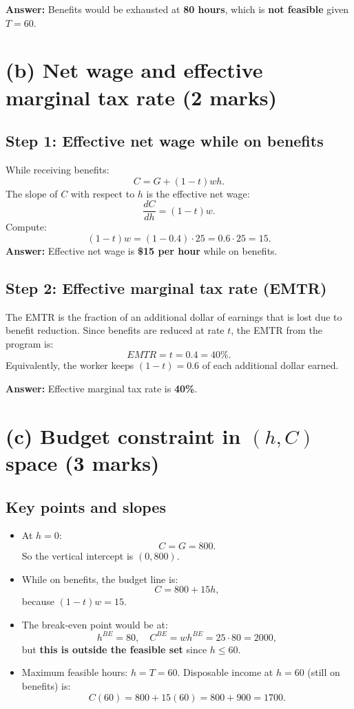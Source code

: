 \documentclass[12pt]{article}
\begin{document}
\textbf{Answer:} Benefits would be exhausted at \textbf{80 hours}, which is \textbf{not feasible} given $T=60$.

\section*{(b) Net wage and effective marginal tax rate (2 marks)}

\subsection*{Step 1: Effective net wage while on benefits}

While receiving benefits:
\[
C = G + (1-t)wh.
\]
The slope of $C$ with respect to $h$ is the effective net wage:
\[
\frac{dC}{dh} = (1-t)w.
\]
Compute:
\[
(1-t)w = (1-0.4)\cdot 25 = 0.6 \cdot 25 = 15.
\]
\textbf{Answer:} Effective net wage is \textbf{\$15 per hour} while on benefits.

\subsection*{Step 2: Effective marginal tax rate (EMTR)}

The EMTR is the fraction of an additional dollar of earnings that is lost due to benefit reduction.  
Since benefits are reduced at rate $t$, the EMTR from the program is:
\[
EMTR = t = 0.4 = 40\%.
\]
Equivalently, the worker keeps $(1-t)=0.6$ of each additional dollar earned.

\textbf{Answer:} Effective marginal tax rate is \textbf{40\%}.

\section*{(c) Budget constraint in $(h,C)$ space (3 marks)}

\subsection*{Key points and slopes}

\begin{itemize}
\item At $h=0$:
\[
C = G = 800.
\]
So the vertical intercept is $(0,800)$.

\item While on benefits, the budget line is:
\[
C = 800 + 15h,
\]
because $(1-t)w=15$.

\item The break-even point would be at:
\[
h^{BE}=80, \quad C^{BE}=wh^{BE}=25\cdot 80=2000,
\]
but \textbf{this is outside the feasible set} since $h \le 60$.

\item Maximum feasible hours: $h=T=60$.
Disposable income at $h=60$ (still on benefits) is:
\[
C(60) = 800 + 15(60) = 800 + 900 = 1700.
\]
\end{itemize}
\end{document}
